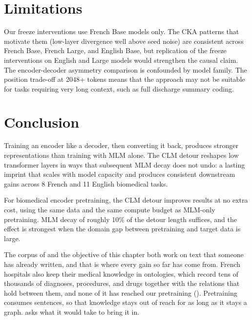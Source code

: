 \section{Limitations}

\begin{reviewread}
Our freeze interventions use French Base models only. The CKA patterns that motivate them (low-layer divergence well above seed noise) are consistent across French Base, French Large, and English Base, but replication of the freeze interventions on English and Large models would strengthen the causal claim. The encoder-decoder asymmetry comparison is confounded by model family. The position trade-off at 2048+ tokens means that the approach may not be suitable for tasks requiring very long context, such as full discharge summary coding.
\end{reviewread}


\section*{Conclusion}

\begin{reviewread}
Training an encoder like a decoder, then converting it back, produces stronger representations than training with MLM alone. The CLM detour reshapes low transformer layers in ways that subsequent MLM decay does not undo: a lasting imprint that scales with model capacity and produces consistent downstream gains across 8 French and 11 English biomedical tasks.
\end{reviewread}

\begin{reviewread}
For biomedical encoder pretraining, the CLM detour improves results at no extra cost, using the same data and the same compute budget as MLM-only pretraining. MLM decay of roughly 10\% of the detour length suffices, and the effect is strongest when the domain gap between pretraining and target data is large.
\end{reviewread}

\vspace{2em}

The corpus of  and the objective of this chapter both work on
text that someone has already written, and that is where every gain so far has come
from. French hospitals also keep their medical knowledge in ontologies, which record
tens of thousands of diagnoses, procedures, and drugs together with the relations that
hold between them, and none of it has reached our pretraining
(). Pretraining consumes sentences, so that knowledge stays
out of reach for as long as it stays a graph.  asks what it would
take to bring it in.
